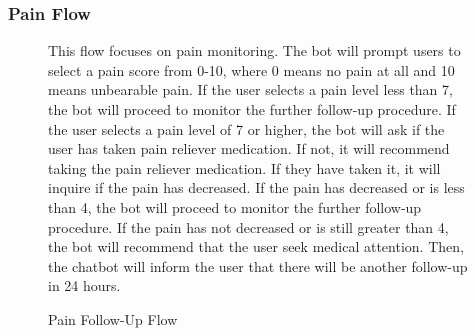 \documentclass[12pt,oneside,openright,a4paper]{cpe-english-project}
\begin{document}
        \subsubsection{Pain Flow}
          \begin{figure}[H]
            \centering
            \caption{Pain Follow-Up Flow}\label{fig:FollowUpFlow3}
            \begin{justify}
              \qquad This flow focuses on pain monitoring. The bot will prompt users to select a pain score from 0-10, where 0 means no pain at all and 10 means unbearable pain. If the user selects a pain level less than 7, the bot will proceed to monitor the further follow-up procedure. If the user selects a pain level of 7 or higher, the bot will ask if the user has taken pain reliever medication. If not, it will recommend taking the pain reliever medication. If they have taken it, it will inquire if the pain has decreased. If the pain has decreased or is less than 4, the bot will proceed to monitor the further follow-up procedure. If the pain has not decreased or is still greater than 4, the bot will recommend that the user seek medical attention. Then, the chatbot will inform the user that there will be another follow-up in 24 hours.\par
            \end{justify}        
          \end{figure}
\end{document}
